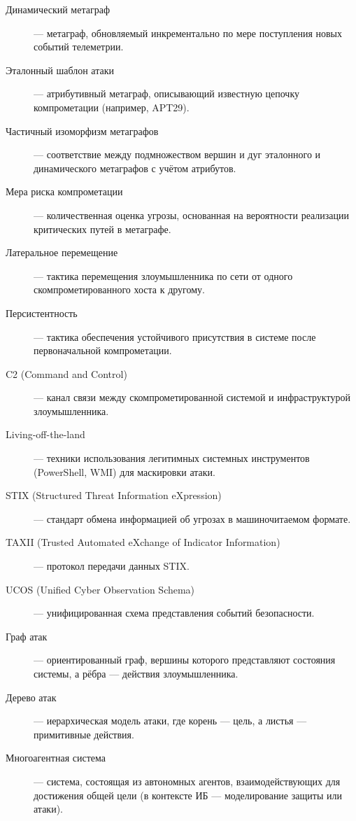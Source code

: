 \begin{description}
    \item[Динамический метаграф] — метаграф, обновляемый инкрементально по мере поступления новых событий телеметрии.
    \item[Эталонный шаблон атаки] — атрибутивный метаграф, описывающий известную цепочку компрометации (например, APT29).
    \item[Частичный изоморфизм метаграфов] — соответствие между подмножеством вершин и дуг эталонного и динамического метаграфов с учётом атрибутов.
    \item[Мера риска компрометации] — количественная оценка угрозы, основанная на вероятности реализации критических путей в метаграфе.
    \item[Латеральное перемещение] — тактика перемещения злоумышленника по сети от одного скомпрометированного хоста к другому.
    \item[Персистентность] — тактика обеспечения устойчивого присутствия в системе после первоначальной компрометации.
    \item[C2 (Command and Control)] — канал связи между скомпрометированной системой и инфраструктурой злоумышленника.
    \item[Living-off-the-land] — техники использования легитимных системных инструментов (PowerShell, WMI) для маскировки атаки.
    \item[STIX (Structured Threat Information eXpression)] — стандарт обмена информацией об угрозах в машиночитаемом формате.
    \item[TAXII (Trusted Automated eXchange of Indicator Information)] — протокол передачи данных STIX.
    \item[UCOS (Unified Cyber Observation Schema)] — унифицированная схема представления событий безопасности.
    \item[Граф атак] — ориентированный граф, вершины которого представляют состояния системы, а рёбра — действия злоумышленника.
    \item[Дерево атак] — иерархическая модель атаки, где корень — цель, а листья — примитивные действия.
    \item[Многоагентная система] — система, состоящая из автономных агентов, взаимодействующих для достижения общей цели (в контексте ИБ — моделирование защиты или атаки).
\end{description}